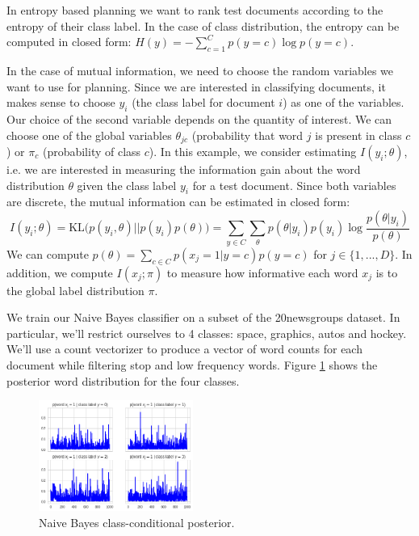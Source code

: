 In entropy based planning we want to rank test documents according to the entropy of their class label. In the case of class distribution, the entropy can be computed in closed form: $H(y) = -\sum_{c=1}^{C}p(y=c) \log p(y=c)$.

In the case of mutual information, we need to choose the random variables we want to use for planning. Since we are interested in classifying documents, it makes sense to choose $y_i$ (the class label for document $i$) as one of the variables. Our choice of the second variable depends on the quantity of interest. We can choose one of the global variables $\theta_{jc}$ (probability that word $j$ is present in class $c$) or $\pi_c$ (probability of class $c$). In this example, we consider estimating $I(y_i;\theta)$, i.e. we are interested in measuring the information gain about the word distribution $\theta$ given the class label $y_i$ for a test document. Since both variables are discrete, the mutual information can be estimated in closed form:
\begin{equation}
    I(y_i;\theta) = \mathrm{KL}\big(p(y_i,\theta)||p(y_i)p(\theta)\big) = \sum_{y \in C}\sum_{\theta} p(\theta|y_i)p(y_i)\log \frac{p(\theta|y_i)}{p(\theta)}
\end{equation}
We can compute $p(\theta) = \sum_{c\in C} p(x_j=1|y=c)p(y=c)$ for $j\in\{1,...,D\}$. In addition, we compute $I(x_j;\pi)$ to measure how informative each word $x_j$ is to the global label distribution $\pi$. 

We train our Naive Bayes classifier on a subset of the 20newsgroups dataset. In particular, we'll restrict ourselves to 4 classes: space, graphics, autos and hockey. We'll use a count vectorizer to produce a vector of word counts for each document while filtering stop and low frequency words. Figure \ref{fig:nb_topics} shows the posterior word distribution for the four classes.
\begin{figure}[b]
    \centering
    \includegraphics[width=0.45\textwidth]{figures/nb_topics.png}
    \caption{Naive Bayes class-conditional posterior.}
    \label{fig:nb_topics}
\end{figure}

